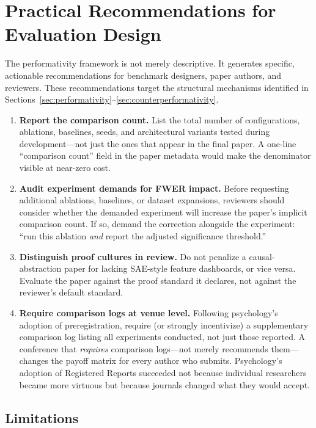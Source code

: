 \documentclass{article}
\begin{document}
\section{Practical Recommendations for Evaluation Design}
\label{sec:recommendations}

The performativity framework is not merely descriptive. It generates specific, actionable recommendations for benchmark designers, paper authors, and reviewers. These recommendations target the structural mechanisms identified in Sections~\ref{sec:performativity}--\ref{sec:counterperformativity}.

\begin{enumerate}[leftmargin=*]
  \item \textbf{Report the comparison count.} List the total number of configurations, ablations, baselines, seeds, and architectural variants tested during development---not just the ones that appear in the final paper. A one-line ``comparison count'' field in the paper metadata would make the denominator visible at near-zero cost.

  \item \textbf{Audit experiment demands for FWER impact.} Before requesting additional ablations, baselines, or dataset expansions, reviewers should consider whether the demanded experiment will increase the paper's implicit comparison count. If so, demand the correction alongside the experiment: ``run this ablation \emph{and} report the adjusted significance threshold.''

  \item \textbf{Distinguish proof cultures in review.} Do not penalize a causal-abstraction paper for lacking SAE-style feature dashboards, or vice versa. Evaluate the paper against the proof standard it declares, not against the reviewer's default standard.

  \item \textbf{Require comparison logs at venue level.} Following psychology's adoption of preregistration, require (or strongly incentivize) a supplementary comparison log listing all experiments conducted, not just those reported. A conference that \emph{requires} comparison logs---not merely recommends them---changes the payoff matrix for every author who submits. Psychology's adoption of Registered Reports succeeded not because individual researchers became more virtuous but because journals changed what they would accept.
\end{enumerate}


\subsection{Limitations}
\label{sec:limitations}
\end{document}
